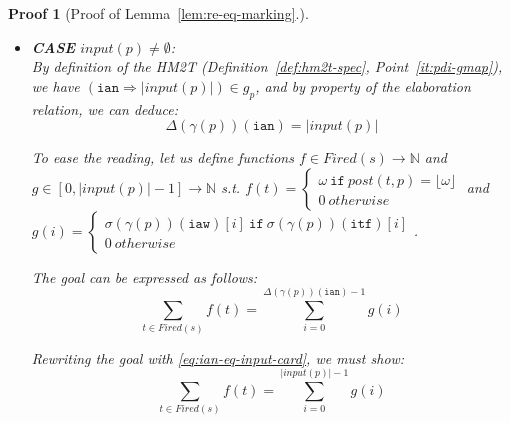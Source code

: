 \documentclass[pdflatex,sn-mathphys]{sn-jnl}%
\theoremstyle{thmstyleone}%
\theoremstyle{thmstyletwo}%
\newtheorem*{pf}{Proof}%
\theoremstyle{thmstylethree}%
\begin{document}
\begin{pf}[Proof of Lemma~\ref{lem:re-eq-marking}.]
\begin{itemize}
    By property of $\mathtt{input}(p)=\emptyset$, we can deduce:
    \begin{equation}
      \sum\limits_{t\in{}Fired(s)}
      \begin{cases}
        \omega~\mathtt{if}~post(t,p)=\lfloor\omega\rfloor \\
        0~otherwise
      \end{cases}=0.
      \label{eq:post-sum-eq-z}    
    \end{equation}

    \noindent{}Rewriting the goal with \eqref{eq:eq-ian-itfz-iawz-0},
    \eqref{eq:eq-ian-itfz-iawz-1}, \eqref{eq:eq-ian-itfz-iawz-2} and
    \eqref{eq:post-sum-eq-z}, we arrive to a tautology.\\
    
  \item \textbf{CASE} $input(p)\neq\emptyset$:\\

    By definition of the HM2T (Definition~\ref{def:hm2t-spec},
    Point~\ref{it:pdi-gmap}), we have
    $(\mathtt{ian}\Rightarrow{}\vert{}input(p)\vert)\in{}g_p$, and by
    property of the elaboration relation, we can deduce:
    \begin{equation}
      \Delta(\gamma(p))(\texttt{ian})=\vert{}input(p)\vert\label{eq:ian-eq-input-card}
    \end{equation}

    To ease the reading, let us define functions
    $f\in{}Fired(s)\rightarrow\mathbb{N}$ and
    $g\in[0,\vert{}input(p)\vert-1]\rightarrow\mathbb{N}$ s.t. $f(t)=
    \begin{cases}
      \omega~\mathtt{if}~post(t,p)=\lfloor\omega\rfloor \\
      0~otherwise
    \end{cases}$
    and $g(i)=
    \begin{cases}
      \sigma(\gamma(p))(\texttt{iaw})[i]~\mathtt{if}~\sigma(\gamma(p))(\texttt{itf})[i]\\
      0~otherwise 
    \end{cases}$.

    \noindent{}The goal can be expressed as follows:
    \begin{equation*}
      \boxed{\sum\limits_{t\in{}Fired(s)}f(t)=\sum\limits_{i=0}^{\Delta(\gamma(p))(\texttt{ian})-1}g(i)}
    \end{equation*}
    
    \noindent{}Rewriting the goal with \eqref{eq:ian-eq-input-card}, we must show:
    \begin{equation*}
      \boxed{\sum\limits_{t\in{}Fired(s)}f(t)=\sum\limits_{i=0}^{\vert{}input(p)\vert-1}g(i)}
    \end{equation*}


\end{itemize}
\end{pf}
\end{document}
